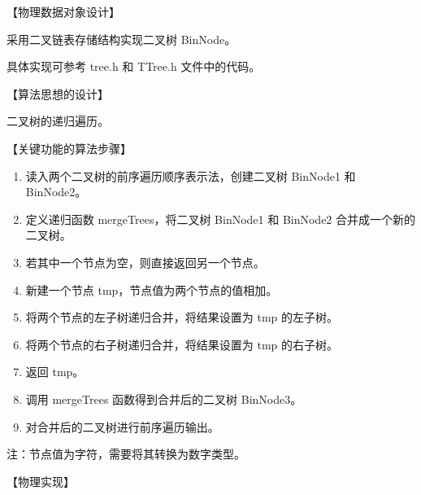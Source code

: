 \documentclass[
]{article}
\begin{document}
【物理数据对象设计】

采用二叉链表存储结构实现二叉树 BinNode。

具体实现可参考 tree.h 和 TTree.h 文件中的代码。

【算法思想的设计】

二叉树的递归遍历。

【关键功能的算法步骤】

\begin{enumerate}
\def\labelenumi{\arabic{enumi}.}
\item
  读入两个二叉树的前序遍历顺序表示法，创建二叉树 BinNode1 和 BinNode2。
\item
  定义递归函数 mergeTrees，将二叉树 BinNode1 和 BinNode2
  合并成一个新的二叉树。
\item
  若其中一个节点为空，则直接返回另一个节点。
\item
  新建一个节点 tmp，节点值为两个节点的值相加。
\item
  将两个节点的左子树递归合并，将结果设置为 tmp 的左子树。
\item
  将两个节点的右子树递归合并，将结果设置为 tmp 的右子树。
\item
  返回 tmp。
\item
  调用 mergeTrees 函数得到合并后的二叉树 BinNode3。
\item
  对合并后的二叉树进行前序遍历输出。
\end{enumerate}

注：节点值为字符，需要将其转换为数字类型。

【物理实现】
\end{document}
